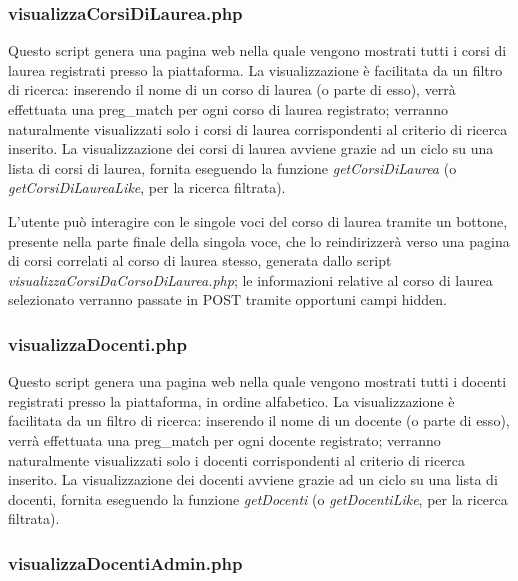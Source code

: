 \documentclass [a4paper,11pt]{book}
\begin{document}
\medskip

\subsubsection{visualizzaCorsiDiLaurea.php}

Questo script genera una pagina web nella quale vengono mostrati tutti i corsi di laurea registrati presso la piattaforma. La visualizzazione è facilitata da un filtro di ricerca: inserendo il nome di un corso di laurea (o parte di esso), verrà effettuata una preg\_match per ogni corso di laurea registrato; verranno naturalmente visualizzati solo i corsi di laurea corrispondenti al criterio di ricerca inserito. La visualizzazione dei corsi di laurea avviene grazie ad un ciclo su una lista di corsi di laurea, fornita eseguendo la funzione \emph{getCorsiDiLaurea} (o \emph{getCorsiDiLaureaLike}, per la ricerca filtrata).

L'utente può interagire con le singole voci del corso di laurea tramite un bottone, presente nella parte finale della singola voce, che lo reindirizzerà verso una pagina di corsi correlati al corso di laurea stesso, generata dallo script \emph{visualizzaCorsiDaCorsoDiLaurea.php}; le informazioni relative al corso di laurea selezionato verranno passate in POST tramite opportuni campi hidden.

\medskip

\subsubsection{visualizzaDocenti.php}

Questo script genera una pagina web nella quale vengono mostrati tutti i docenti registrati presso la piattaforma, in ordine alfabetico. La visualizzazione è facilitata da un filtro di ricerca: inserendo il nome di un docente (o parte di esso), verrà effettuata una preg\_match per ogni docente registrato; verranno naturalmente visualizzati solo i docenti corrispondenti al criterio di ricerca inserito. La visualizzazione dei docenti avviene grazie ad un ciclo su una lista di docenti, fornita eseguendo la funzione \emph{getDocenti} (o \emph{getDocentiLike}, per la ricerca filtrata).

\medskip

\subsubsection{visualizzaDocentiAdmin.php}
\end{document}
